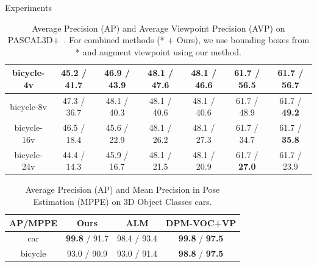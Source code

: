 \documentclass[serif,mathserif,final]{beamer}
\newcommand{\1}{\mathbb{I}} %
\begin{document}
\begin{frame}{}
\begin{columns}[t]
\begin{column}{0.23\linewidth}
\begin{block}{Experiments}
\begin{table}[t]
\begin{center}
\begin{tabular}{|c||c||c||c|c||c|c|}
    bicycle-4v          & 45.2 / 41.7         & 46.9 / 43.9             & 48.1 / 47.6       & 48.1 / 46.6        & 61.7 / 56.5         & 61.7 / \textbf{56.7}\\ \hline
    bicycle-8v          & 47.3 / 36.7         & 48.1 / 40.3             & 48.1 / 40.6       & 48.1 / 40.6        & 61.7 / 48.9         & 61.7 / \textbf{49.2}\\ \hline
    bicycle-16v         & 46.5 / 18.4         & 45.6 / 22.9             & 48.1 / 26.2       & 48.1 / 27.3        & 61.7 / 34.7         & 61.7 / \textbf{35.8}\\ \hline
    bicycle-24v         & 44.4 / 14.3         & 45.9 / 16.7             & 48.1 / 21.5       & 48.1 / 20.9        & 61.7 / \textbf{27.0}         & 61.7 / 23.9\\ \hline
    \end{tabular}
  \end{center}
\caption{Average Precision (AP) and Average Viewpoint Precision (AVP) on
  PASCAL3D+~\cite{Xiang14}. For combined methods (* + Ours), we use
  bounding boxes from * and augment viewpoint using our method.}
\label{tab:pascal12}
\end{table}


        \begin{table}
          \begin{center}
            \begin{tabular}{|c|c|c|c|}
            \hline
            AP/MPPE& Ours & ALM & DPM-VOC+VP \\
            \hline\hline
            car     & \textbf{99.8} / 91.7 & 98.4 / 93.4 & \textbf{99.8} / \textbf{97.5} \\ 
            bicycle & 93.0 / 90.9          & 93.0 / 91.4 & \textbf{98.8} / \textbf{97.5} \\
            \hline
            \end{tabular}
          \end{center}
          \caption{\small Average Precision (AP) and Mean Precision in Pose
            Estimation (MPPE) on 3D Object Classes cars.}%
          \label{tab:3dobject}
        \end{table}
        \vspace{-1.0em}


\end{block}
\end{column}
\end{columns}
\end{frame}
\end{document}
